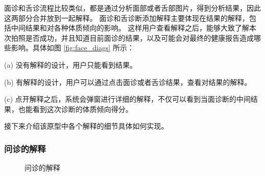 面诊和舌诊流程比较类似，都是通过分析面部或者舌部图片，得到分析结果，因此这两部分合并放到一起解释。
面诊和舌诊断添加解释主要体现在结果的解释，包括中间结果和对各种体质倾向的影响。
这样用户查看解释之后，能够大致了解本次拍照是否成功，并且知道目前面诊的结果，以及可能会对最终的健康报告造成哪些影响。具体如图 \ref{fig:face_diags} 所示：

(a) 没有解释的设计，用户只能看到结果。

(b) 有解释的设计，用户可以通过点击面诊或者舌诊结果，查看对结果的解释。

(c) 点开解释之后，系统会弹窗进行详细的解释，不仅可以看到当面诊断的中间结果，也能看到这次诊断的体质倾向得分。

接下来介绍该原型中各个解释的细节具体如何实现。


\subsubsection{问诊的解释}

\begin{figure}
    \centering
    \caption{问诊的解释}
    \label{fig:questions}
\end{figure}

